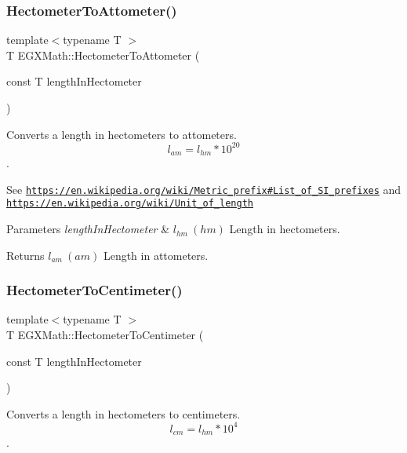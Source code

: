 \subsubsection{\texorpdfstring{Hectometer\+To\+Attometer()}{HectometerToAttometer()}}
{\footnotesize\ttfamily template$<$typename T $>$ \\
T E\+G\+X\+Math\+::\+Hectometer\+To\+Attometer (\begin{DoxyParamCaption}\item[{const T}]{length\+In\+Hectometer }\end{DoxyParamCaption})}



Converts a length in hectometers to attometers. \[ l_{am}=l_{hm} * 10^{20} \]. 

See \href{https://en.wikipedia.org/wiki/Metric_prefix#List_of_SI_prefixes}{\tt https\+://en.\+wikipedia.\+org/wiki/\+Metric\+\_\+prefix\#\+List\+\_\+of\+\_\+\+S\+I\+\_\+prefixes} and \href{https://en.wikipedia.org/wiki/Unit_of_length}{\tt https\+://en.\+wikipedia.\+org/wiki/\+Unit\+\_\+of\+\_\+length} 
\begin{DoxyParams}{Parameters}
{\em length\+In\+Hectometer} & $ l_{hm}\ (hm)$ Length in hectometers. \\
\hline
\end{DoxyParams}
\begin{DoxyReturn}{Returns}
$ l_{am}\ (am)$ Length in attometers. 
\end{DoxyReturn}
\mbox{\label{group___e_g_x_math-_conversions-_length_conversions-_hectometer-_s_i_gace00e5f71f5c29d8022319c3bf63745d}} 
\subsubsection{\texorpdfstring{Hectometer\+To\+Centimeter()}{HectometerToCentimeter()}}
{\footnotesize\ttfamily template$<$typename T $>$ \\
T E\+G\+X\+Math\+::\+Hectometer\+To\+Centimeter (\begin{DoxyParamCaption}\item[{const T}]{length\+In\+Hectometer }\end{DoxyParamCaption})}



Converts a length in hectometers to centimeters. \[ l_{cm}=l_{hm} * 10^{4} \]. 


